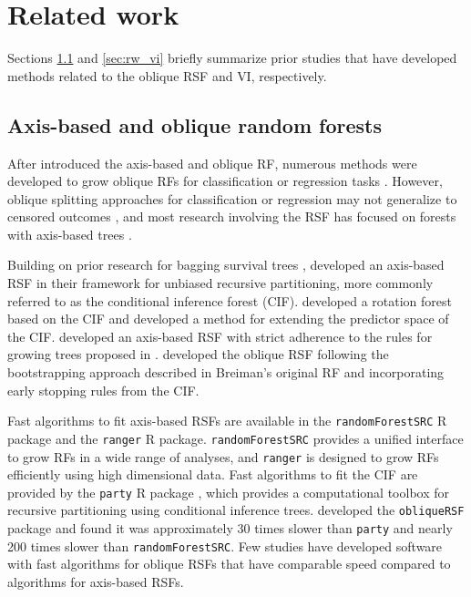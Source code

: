 \documentclass[twoside,11pt]{article}\usepackage[]{graphicx}\usepackage[]{xcolor}
\newcommand{\eg}{for example}
\begin{document}
\section{Related work} \label{sec:background}

Sections \ref{sec:rw_forests} and \ref{sec:rw_vi} briefly summarize prior studies that have developed methods related to the oblique RSF and VI, respectively.

\subsection{Axis-based and oblique random forests} \label{sec:rw_forests}

After \citet{breiman2001random} introduced the axis-based and oblique RF, numerous methods were developed to grow oblique RFs for classification or regression tasks \citep{menze2011oblique, zhang2014oblique, rainforth2015canonical, zhu2015reinforcement, poona2016investigating, qiu2017oblique, tomita2020sparse, katuwal2020heterogeneous}. However, oblique splitting approaches for classification or regression may not generalize to censored outcomes \citep[\eg, see][Section~4.5.1]{zhu2013tree}, and most research involving the RSF has focused on forests with axis-based trees \citep{wang2017selective}.

Building on prior research for bagging survival trees \citep{hothorn2004bagging}, \citet{hothorn2006unbiased} developed an axis-based RSF in their framework for unbiased recursive partitioning, more commonly referred to as the conditional inference forest (CIF). \citet{zhou2016random} developed a rotation forest based on the CIF and \citet{wang2017random} developed a method for extending the predictor space of the CIF. \citet{ishwaran2008random} developed an axis-based RSF with strict adherence to the rules for growing trees proposed in \citet{breiman2001random}.  \citet{jaeger2019oblique} developed the oblique RSF following the bootstrapping approach described in Breiman's original RF and incorporating early stopping rules from the CIF.

Fast algorithms to fit axis-based RSFs are available in the \texttt{randomForestSRC} R package \citep{randomForestSRC} and the \texttt{ranger} \citep{ranger} R package. \texttt{randomForestSRC} provides a unified interface to grow RFs in a wide range of analyses, and \texttt{ranger} is designed to grow RFs efficiently using high dimensional data. Fast algorithms to fit the CIF are provided by the \texttt{party} R package \citep{hothorn2010party}, which provides a computational toolbox for recursive partitioning using conditional inference trees. \citet{jaeger2019oblique} developed the \texttt{obliqueRSF} package and found it was approximately 30 times slower than \texttt{party} and nearly 200 times slower than \texttt{randomForestSRC}. Few studies have developed software with fast algorithms for oblique RSFs that have comparable speed compared to algorithms for axis-based RSFs.
\end{document}
